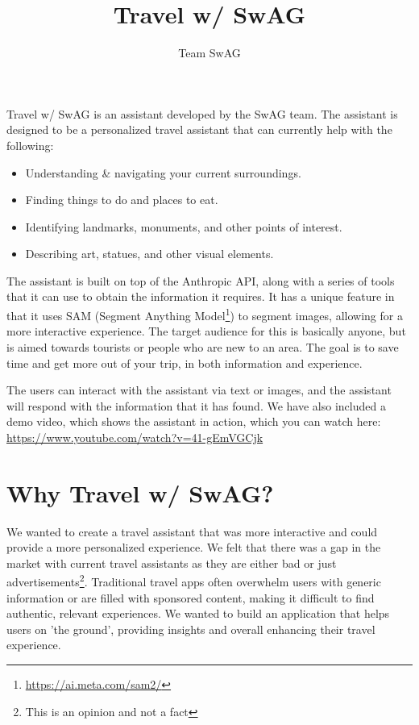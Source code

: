 \documentclass{article}
\begin{document}
\author{
    Team SwAG
}


\title{Travel w/ SwAG}
\maketitle

\begin{acronym}
\end{acronym}


Travel w/ SwAG is an assistant developed by the \ac{SwAG} team. The assistant is designed to be a personalized travel assistant that can currently help with the following:

\begin{itemize}
\item Understanding \& navigating your current surroundings.
\item Finding things to do and places to eat.
\item Identifying landmarks, monuments, and other points of interest.
\item Describing art, statues, and other visual elements.
\end{itemize}

    The assistant is built on top of the Anthropic API, along with a series of tools that it can use to obtain the information it requires. It has a unique feature in that it uses SAM (Segment Anything Model\footnote{\url{https://ai.meta.com/sam2/}}) to segment images, allowing for a more interactive experience. The target audience for this is basically anyone, but is aimed towards tourists or people who are new to an area. The goal is to save time and get more out of your trip, in both information and experience.

The users can interact with the assistant via text or images, and the assistant will respond with the information that it has found. We have also included a demo video, which shows the assistant in action, which you can watch here: \url{https://www.youtube.com/watch?v=41-gEmVGCjk}

\section{Why Travel w/ SwAG?}

We wanted to create a travel assistant that was more interactive and could provide a more personalized experience. We felt that there was a gap in the market with current travel assistants as they are either bad or just advertisements\footnote{This is an opinion and not a fact}. Traditional travel apps often overwhelm users with generic information or are filled with sponsored content, making it difficult to find authentic, relevant experiences. We wanted to build an application that helps users on 'the ground', providing insights and overall enhancing their travel experience.
\end{document}
